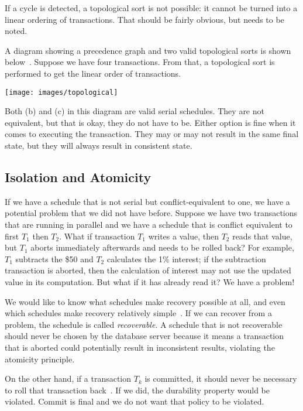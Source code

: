 \documentclass[a4paper]{report}
\begin{document}
If a cycle is detected, a topological sort is not possible: it cannot be turned into a linear ordering of transactions. That should be fairly obvious, but needs to be noted.

A diagram showing a precedence graph and two valid topological sorts is shown below~\cite{dsc}. Suppose we have four transactions. From that, a topological sort is performed to get the linear order of transactions.

\begin{center}
\texttt{[image: images/topological]}
\end{center}

Both (b) and (c) in this diagram are valid serial schedules. They are not equivalent, but that is okay, they do not have to be. Either option is fine when it comes to executing the transaction. They may or may not result in the same final state, but they will always result in consistent state.

\subsection*{Isolation and Atomicity}

If we have a schedule that is not serial but conflict-equivalent to one, we have a potential problem that we did not have before. Suppose we have two transactions that are running in parallel and we have a schedule that is conflict equivalent to first $T_{1}$ then $T_{2}$. What if transaction $T_{1}$ writes a value, then $T_{2}$ reads that value, but $T_{1}$ aborts immediately afterwards and needs to be rolled back? For example, $T_{1}$ subtracts the \$50 and $T_{2}$ calculates the 1\% interest; if the subtraction transaction is aborted, then the calculation of interest may not use the updated value in its computation. But what if it has already read it? We have a problem!

We would like to know what schedules make recovery possible at all, and even which schedules make recovery relatively simple~\cite{fds}. If we can recover from a problem, the schedule is called \textit{recoverable}. A schedule that is not recoverable should never be chosen by the database server because it means a transaction that is aborted could potentially result in inconsistent results, violating the atomicity principle.

On the other hand, if a transaction $T_{k}$ is committed, it should never be necessary to roll that transaction back~\cite{fds}. If we did, the durability property would be violated. Commit is final and we do not want that policy to be violated.
\end{document}
